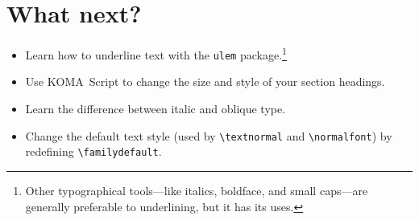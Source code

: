\section{What next?}
\begin{itemize}
\item Learn how to underline text with the \texttt{ulem}
    package.\punckern\footnote{Other typographical tools---like italics,
    boldface, and small caps---are generally preferable to underlining,
    but it has its uses.}
\item Use KOMA~Script to change the size and style of your section headings.
\item Learn the difference between italic and oblique type.
\item Change the default text style
    (used by \verb|\textnormal| and \verb|\normalfont|) by redefining
    \verb|\familydefault|.
\end{itemize}
